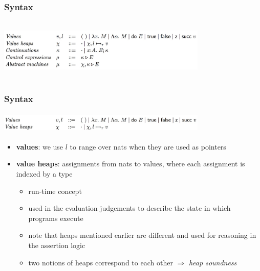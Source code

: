 \documentclass[xcolor=dvipsnames,9pt,hide notes,mathserif]{beamer}
\begin{document}
\begin{frame}
  \frametitle{Syntax}
\begin{center}
    \includegraphics[width=10cm, height=3cm]{inputs/operational_syntax_htt}
\end{center}
\end{frame}






\begin{frame}
  \frametitle{Syntax}
\begin{center}
    \includegraphics[width=10cm, height=1cm]{inputs/vv}
\end{center}
\begin{itemize}
\item {\bf values}: we use $l$ to range over nats when they are used as
  pointers
\item {\bf value heaps}: assignments from nats to values, where each
  assignment is indexed by a type
\begin{itemize}
\item run-time concept
\item used in the evaluation judgements to describe the state in which
  programs execute
\item note that heaps mentioned earlier are different and used for
  reasoning in the assertion logic
\end{itemize}
\begin{itemize}
\item two notions of heaps correspond to each other $\Rightarrow$
  \textit{heap soundness}
\end{itemize}
\end{itemize}
\end{frame}
\end{document}
